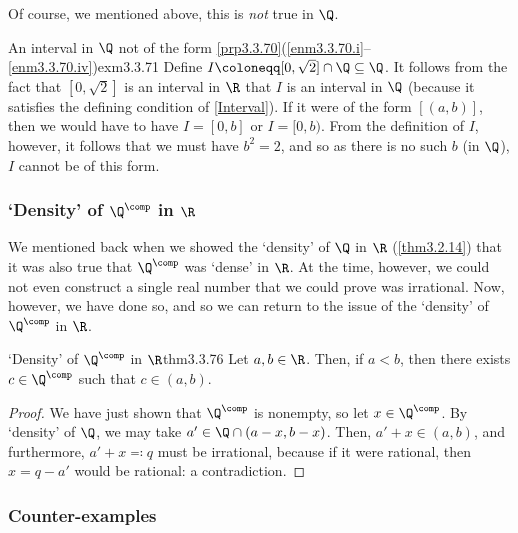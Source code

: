 Of course, we mentioned above, this is \emph{not} true in $\Q$.
\begin{exm}{An interval in $\Q$ not of the form \cref{prp3.3.70}(\cref{enm3.3.70.i}--\cref{enm3.3.70.iv})}{exm3.3.71}
Define $I\coloneqq [0,\sqrt{2}]\cap \Q \subseteq \Q$.  It follows from the fact  that $[0,\sqrt{2}]$ is an interval in $\R$ that $I$ is an interval in $\Q$ (because it satisfies the defining condition of \cref{Interval}).  If it were of the form $[(a,b)]$, then we would have to have $I=[0,b]$ or $I=[0,b)$.  From the definition of $I$, however, it follows that we must have $b^2=2$, and so as there is no such $b$ (in $\Q$), $I$ cannot be of this form.
\end{exm}

\subsubsection{`Density' of \texorpdfstring{$\Q ^{\comp}$}{Qc} in \texorpdfstring{$\R$}{R}}

We mentioned back when we showed the `density' of $\Q$ in $\R$ (\cref{thm3.2.14}) that it was also true that $\Q ^{\comp}$ was `dense' in $\R$.  At the time, however, we could not even construct a single real number that we could prove was irrational.  Now, however, we have done so, and so we can return to the issue of the `density' of $\Q ^{\comp}$ in $\R$.
\begin{thm}{`Density' of $\Q ^{\comp}$ in $\R$}{thm3.3.76}
Let $a,b\in \R$.  Then, if $a<b$, then there exists $c\in \Q ^{\comp}$ such that $c\in (a,b)$.
\begin{proof}
We have just shown that $\Q ^{\comp}$ is nonempty, so let $x\in \Q ^{\comp}$.  By `density' of $\Q$, we may take $a'\in \Q \cap (a-x,b-x)$.  Then, $a'+x\in (a,b)$, and furthermore, $a'+x\eqqcolon q$ must be irrational, because if it were rational, then $x=q-a'$ would be rational:  a contradiction.
\end{proof}
\end{thm}

\subsubsection{Counter-examples}

